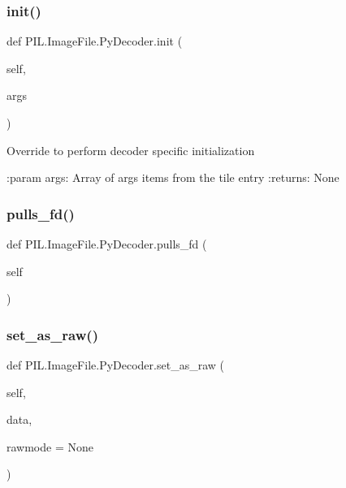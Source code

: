 \subsubsection{\texorpdfstring{init()}{init()}}
{\footnotesize\ttfamily def P\+I\+L.\+Image\+File.\+Py\+Decoder.\+init (\begin{DoxyParamCaption}\item[{}]{self,  }\item[{}]{args }\end{DoxyParamCaption})}

\begin{DoxyVerb}Override to perform decoder specific initialization

:param args: Array of args items from the tile entry
:returns: None
\end{DoxyVerb}
 \mbox{\label{classPIL_1_1ImageFile_1_1PyDecoder_a03e4d24558b2f5a9fd92aabef612d22c}} 
\subsubsection{\texorpdfstring{pulls\+\_\+fd()}{pulls\_fd()}}
{\footnotesize\ttfamily def P\+I\+L.\+Image\+File.\+Py\+Decoder.\+pulls\+\_\+fd (\begin{DoxyParamCaption}\item[{}]{self }\end{DoxyParamCaption})}

\mbox{\label{classPIL_1_1ImageFile_1_1PyDecoder_a74d72fef9fe671a78ca05f8c4ed0838c}} 
\subsubsection{\texorpdfstring{set\+\_\+as\+\_\+raw()}{set\_as\_raw()}}
{\footnotesize\ttfamily def P\+I\+L.\+Image\+File.\+Py\+Decoder.\+set\+\_\+as\+\_\+raw (\begin{DoxyParamCaption}\item[{}]{self,  }\item[{}]{data,  }\item[{}]{rawmode = {\ttfamily None} }\end{DoxyParamCaption})}

